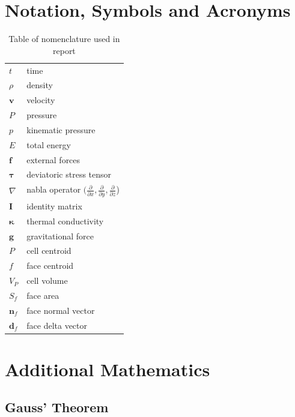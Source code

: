 \documentclass[final,3p,times,twocolumn]{elsarticle}
\begin{document}
\appendix

\section{Notation, Symbols and Acronyms}
\label{app:notation}

\begin{table}[ht]
\caption{Table of nomenclature used in report}
\label{tab:notation}
\begin{tabular}{ll}
\hline
$t$               & time                     \\
$\rho$            & density                  \\
$\mathbf{v}$      & velocity                 \\
$P$               & pressure                 \\
$p$               & kinematic pressure       \\
$E$               & total energy             \\
$\mathbf{f}$      & external forces          \\
$\mathbf{\tau}$   & deviatoric stress tensor \\
$\nabla$ & nabla operator $(\frac{\partial}{\partial x}, \frac{\partial}{\partial y}, \frac{\partial}{\partial z}$) \\
$\mathbf{I}$      & identity matrix          \\
$\mathbf{\kappa}$ & thermal conductivity     \\
$\mathbf{g}$      & gravitational force      \\
$P$               & cell centroid            \\
$f$               & face centroid            \\
$V_P$             & cell volume              \\
$S_f$             & face area                \\
$\mathbf{n}_f$    & face normal vector       \\
$\mathbf{d}_f$    & face delta vector       
\end{tabular}
\end{table}

\section{Additional Mathematics}
\label{app:maths}
\subsection{Gauss' Theorem}
\end{document}
